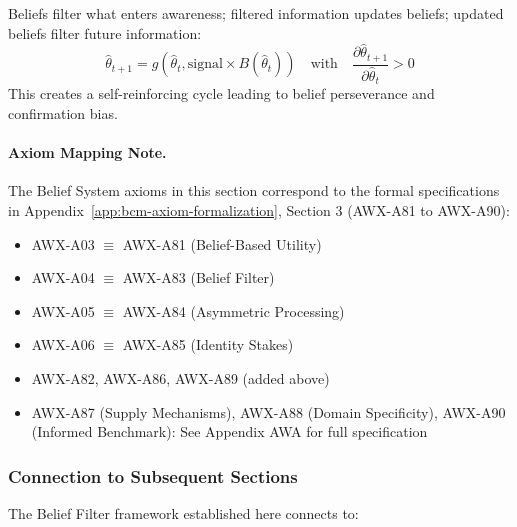 \begin{tcolorbox}[colback=gray!5!white, colframe=gray!75!black, title=Axiom AWX-A89: Belief-Awareness Feedback Loop]
Beliefs filter what enters awareness; filtered information updates beliefs; 
updated beliefs filter future information:
\begin{equation}
\hat{\theta}_{t+1} = g(\hat{\theta}_t, \text{signal} \times B(\hat{\theta}_t)) 
\quad \text{with} \quad \frac{\partial \hat{\theta}_{t+1}}{\partial \hat{\theta}_t} > 0
\end{equation}
This creates a self-reinforcing cycle leading to belief perseverance and 
confirmation bias.
\end{tcolorbox}

\paragraph{Axiom Mapping Note.}
The Belief System axioms in this section correspond to the formal specifications 
in Appendix~\ref{app:bcm-axiom-formalization}, Section 3 (AWX-A81 to AWX-A90):
\begin{itemize}
    \item AWX-A03 $\equiv$ AWX-A81 (Belief-Based Utility)
    \item AWX-A04 $\equiv$ AWX-A83 (Belief Filter)
    \item AWX-A05 $\equiv$ AWX-A84 (Asymmetric Processing)
    \item AWX-A06 $\equiv$ AWX-A85 (Identity Stakes)
    \item AWX-A82, AWX-A86, AWX-A89 (added above)
    \item AWX-A87 (Supply Mechanisms), AWX-A88 (Domain Specificity), 
          AWX-A90 (Informed Benchmark): See Appendix AWA for full specification
\end{itemize}

\subsubsection{Connection to Subsequent Sections}
\label{subsubsec:connections}

The Belief Filter framework established here connects to:


